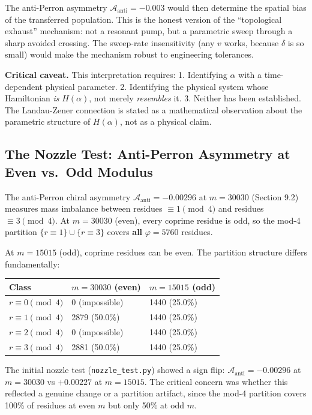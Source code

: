 \documentclass[11pt,letterpaper]{article}
\theoremstyle{definition}
\theoremstyle{remark}
\begin{document}
The anti-Perron asymmetry $\mathcal{A}_{\text{anti}} = -0.003$ would then determine the spatial bias of the transferred population. This is the honest version of the ``topological exhaust'' mechanism: not a resonant pump, but a parametric sweep through a sharp avoided crossing. The sweep-rate insensitivity (any $v$ works, because $\delta$ is so small) would make the mechanism robust to engineering tolerances.

\textbf{Critical caveat.} This interpretation requires: 1. Identifying $\alpha$ with a time-dependent physical parameter. 2. Identifying the physical system whose Hamiltonian \emph{is} $H(\alpha)$, not merely \emph{resembles} it. 3. Neither has been established. The Landau-Zener connection is stated as a mathematical observation about the parametric structure of $H(\alpha)$, not as a physical claim.

\subsection{The Nozzle Test: Anti-Perron Asymmetry at Even vs.~Odd Modulus}\label{the-nozzle-test-anti-perron-asymmetry-at-even-vs.-odd-modulus}

The anti-Perron chiral asymmetry $\mathcal{A}_{\text{anti}} = -0.00296$ at $m = 30030$ (Section 9.2) measures mass imbalance between residues $\equiv 1 \pmod{4}$ and residues $\equiv 3 \pmod{4}$. At $m = 30030$ (even), every coprime residue is odd, so the mod-4 partition $\{r \equiv 1\} \cup \{r \equiv 3\}$ covers \textbf{all} $\varphi = 5760$ residues.

At $m = 15015$ (odd), coprime residues can be even. The partition structure differs fundamentally:

\begin{longtable}[]{@{}lll@{}}
\toprule
Class & $m = 30030$ (even) & $m = 15015$ (odd) \\
\midrule
\endhead
\bottomrule
$r \equiv 0 \pmod{4}$ & 0 (impossible) & 1440 (25.0\%) \\
$r \equiv 1 \pmod{4}$ & 2879 (50.0\%) & 1440 (25.0\%) \\
$r \equiv 2 \pmod{4}$ & 0 (impossible) & 1440 (25.0\%) \\
$r \equiv 3 \pmod{4}$ & 2881 (50.0\%) & 1440 (25.0\%) \\
\end{longtable}

The initial nozzle test (\texttt{nozzle\_test.py}) showed a sign flip: $\mathcal{A}_{\text{anti}} = -0.00296$ at $m = 30030$ vs $+0.00227$ at $m = 15015$. The critical concern was whether this reflected a genuine change or a partition artifact, since the mod-4 partition covers 100\% of residues at even $m$ but only 50\% at odd $m$.
\end{document}
